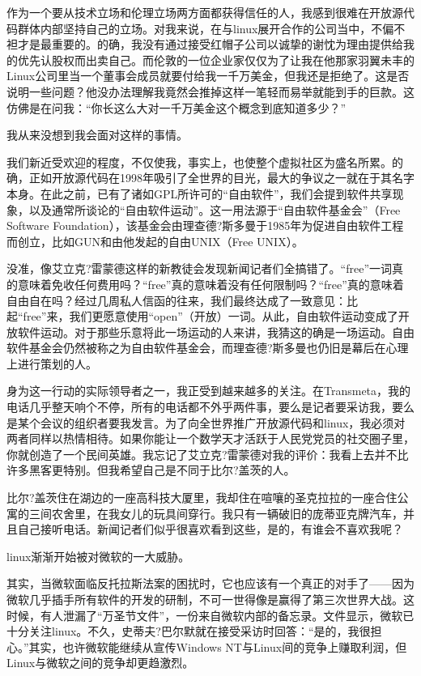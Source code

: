作为一个要从技术立场和伦理立场两方面都获得信任的人，我感到很难在开放源代码群体内部坚持自己的立场。对我来说，在与linux展开合作的公司当中，不偏不袒才是最重要的。的确，我没有通过接受红帽子公司以诚挚的谢忱为理由提供给我的优先认股权而出卖自己。而伦敦的一位企业家仅仅为了让我在他那家羽翼未丰的Linux公司里当一个董事会成员就要付给我一千万美金，但我还是拒绝了。这是否说明一些问题？他没办法理解我竟然会推掉这样一笔轻而易举就能到手的巨款。这仿佛是在问我：“你长这么大对一千万美金这个概念到底知道多少？”

我从来没想到我会面对这样的事情。

我们新近受欢迎的程度，不仅使我，事实上，也使整个虚拟社区为盛名所累。的确，正如开放源代码在1998年吸引了全世界的目光，最大的争议之一就在于其名字本身。在此之前，已有了诸如GPL所许可的“自由软件”，我们会提到软件共享现象，以及通常所谈论的“自由软件运动”。这一用法源于“自由软件基金会”（Free Software Foundation），该基金会由理查德?斯多曼于1985年为促进自由软件工程而创立，比如GUN和由他发起的自由UNIX（Free UNIX）。

没准，像艾立克?雷蒙德这样的新教徒会发现新闻记者们全搞错了。“free”一词真的意味着免收任何费用吗？“free”真的意味着没有任何限制吗？“free”真的意味着自由自在吗？经过几周私人信函的往来，我们最终达成了一致意见：比起“free”来，我们更愿意使用“open”（开放）一词。从此，自由软件运动变成了开放软件运动。对于那些乐意将此一场运动的人来讲，我猜这的确是一场运动。自由软件基金会仍然被称之为自由软件基金会，而理查德?斯多曼也仍旧是幕后在心理上进行策划的人。

身为这一行动的实际领导者之一，我正受到越来越多的关注。在Transmeta，我的电话几乎整天响个不停，所有的电话都不外乎两件事，要么是记者要采访我，要么是某个会议的组织者要我发言。为了向全世界推广开放源代码和linux，我必须对两者同样以热情相待。如果你能让一个数学天才活跃于人民党党员的社交圈子里，你就创造了一个民间英雄。我忘记了艾立克?雷蒙德对我的评价：我看上去并不比许多黑客更特别。但我希望自己是不同于比尔?盖茨的人。

比尔?盖茨住在湖边的一座高科技大厦里，我却住在喧嚷的圣克拉拉的一座合住公寓的三间农舍里，在我女儿的玩具间穿行。我只有一辆破旧的庞蒂亚克牌汽车，并且自己接听电话。新闻记者们似乎很喜欢看到这些，是的，有谁会不喜欢我呢？

linux渐渐开始被对微软的一大威胁。

其实，当微软面临反托拉斯法案的困扰时，它也应该有一个真正的对手了——因为微软几乎插手所有软件的开发的研制，不可一世得像是赢得了第三次世界大战。这时候，有人泄漏了“万圣节文件”，一份来自微软内部的备忘录。文件显示，微软已十分关注linux。不久，史蒂夫?巴尔默就在接受采访时回答：“是的，我很担心。”其实，也许微软能继续从宣传Windows NT与Linux间的竞争上赚取利润，但Linux与微软之间的竞争却更趋激烈。

